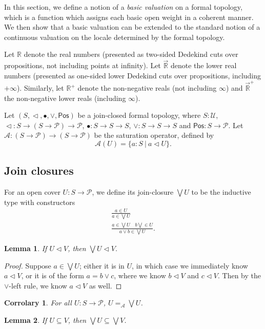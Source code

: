 \documentclass{article}           %
\newtheorem{lemma}{Lemma}
\newtheorem{corrolary}{Corrolary}
\newcommand{\R}{\mathbb{R}}
\newcommand{\lowerT}[1]{\overrightarrow{#1}}
\newcommand{\cov}{\vartriangleleft}
\newcommand{\Pos}{\mathsf{Pos}}
\newcommand{\Type}{\mathcal{U}}
\newcommand{\Prop}{\mathcal{P}}
\newcommand{\suchthat}{\ |\ }
\begin{document}
In this section, we define a notion of a \emph{basic valuation} on a formal topology, which is a function which assigns each basic open weight in a coherent manner. We then show that a basic valuation can be extended to the standard notion of a continuous valuation on the locale determined by the formal topology.

Let $\R$ denote the real numbers (presented as two-sided Dedekind cuts over propositions, not including points at infinity). Let $\lowerT{\R}$ denote the lower real numbers (presented as one-sided lower Dedekind cuts over propositions, including $+\infty$). Similarly, let $\R^+$ denote the non-negative reals (not including $\infty$) and $\lowerT{\R}^+$ the non-negative lower reals (including $\infty$).

Let $(S, \cov, \bullet, \vee, \Pos)$ be a join-closed formal topology, where $S : \Type$, $\cov : S \to (S \to \Prop) \to \Prop$, $\bullet : S \to S \to S$, $\vee : S \to S \to S$ and $\Pos : S \to \Prop$. Let $\mathcal{A} : (S \to \Prop) \to (S \to \Prop)$ be the saturation operator, defined by
\[
\mathcal{A}(U) = \{ a : S \suchthat a \cov U\}.
\]

\subsection{Join closures}
For an open cover $U : S \to \Prop$, we define its join-closure $\bigvee U$ to be the inductive type with constructors
\begin{gather*}
\frac
{a \in U}
{a \in \bigvee U}
\tag{$\bigvee$-refl}
\\
\frac
{a \in \bigvee U \quad b \bigvee \in U}
{a \vee b \in \bigvee U}.
\tag{$\bigvee$-join}
\end{gather*}

\begin{lemma}
\label{bigvee-cov}
If $U \cov V$, then $\bigvee U \cov V$.
\end{lemma}
\begin{proof}
Suppose $a \in \bigvee U$; either it is in $U$, in which case we immediately know $a \cov V$, or it is of the form $a = b \vee c$, where we know $b \cov V$ and $c \cov V$. Then by the $\vee$-left rule, we know $a \cov V$ as well.
\end{proof}

\begin{corrolary}
For all $U : S \to \Prop$, $U =_\mathcal{A} \bigvee U$.
\end{corrolary}

\begin{lemma}
\label{bigvee-subset}
If $U \subseteq V$, then $\bigvee U \subseteq \bigvee V$.
\end{lemma}
\end{document}
